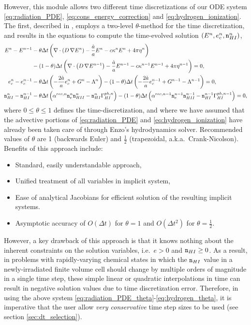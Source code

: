 \documentclass[letterpaper,10pt]{article}
\renewcommand{\(}{\left(}
\renewcommand{\)}{\right)}
\newcommand{\dt}{\Delta t}
\newcommand{\mn}{{\tt n}}
\begin{document}
However, this module allows two different time discretizations of our
ODE system \eqref{eq:radiation_PDE}, \eqref{eq:cons_energy_correction}
and \eqref{eq:hydrogen_ionization}.  The first, described in
\cite{ReynoldsHayesPaschosNorman2009}, employs a two-level
$\theta$-method for the time discretization, and results in the
equations to compute the time-evolved solution $(E^n,e_c^n,\mn_{HI}^n)$,
\begin{align}
  \label{eq:radiation_PDE_theta}
  E^n - E^{n-1} &- \theta\dt\left(\nabla\cdot\(D\,\nabla E^n\) - \frac{\dot{a}}{a} E^n -
    c\kappa^n E^n + 4\pi\eta^n\right) \\ 
  \notag
  & - (1-\theta)\dt\left(\nabla\cdot\(D\,\nabla E^{n-1}\) - \frac{\dot{a}}{a} E^{n-1} -
    c\kappa^{n-1} E^{n-1} + 4\pi\eta^{n-1}\right) = 0, \\ 
  \label{eq:energy_correction_theta}
  e_c^n - e_c^{n-1} &- \theta\dt\left(-\frac{2\dot{a}}{a}e_c^{n} + G^{n} -
    \Lambda^{n}\right) - (1-\theta)\dt\left(-\frac{2\dot{a}}{a}e_c^{n-1} + G^{n-1} -
    \Lambda^{n-1}\right) = 0, \\
  \label{eq:hydrogen_theta}
  \mn_{HI}^n - \mn_{HI}^{n-1} &-
    \theta\dt\left(\alpha^{rec,n} \mn_e^{n} \mn_{HII}^{n} -
      \mn_{HI}^{n} \Gamma_{HI}^{ph,n}\right) -
    (1-\theta)\dt\left(\alpha^{rec,n-1} \mn_e^{n-1} \mn_{HII}^{n-1} -
      \mn_{HI}^{n-1} \Gamma_{HI}^{ph,n-1}\right) = 0,
\end{align}
where $0\le\theta\le 1$ defines the time-discretization, and where we
have assumed that the advective portions of \eqref{eq:radiation_PDE}
and \eqref{eq:hydrogen_ionization} have already been taken care of
through Enzo's hydrodynamics solver.  Recommended values of $\theta$
are 1 (backwards Euler) and $\frac12$ (trapezoidal,
a.k.a.~Crank-Nicolson).  Benefits of this approach include:
\begin{itemize}
\item Standard, easily understandable approach,
\item Unified treatment of all variables in implicit system,
\item Ease of analytical Jacobians for efficient solution of the
  resulting implicit systems.
\item Asymptotic accuracy of $O(\dt)$ for $\theta=1$ and $O(\dt^2)$
  for $\theta=\frac12$. 
\end{itemize}
However, a key drawback of this approach is that it knows nothing
about the inherent constraints on the solution variables, i.e.~$e>0$
and $\mn_{HI}\ge 0$.  As a result, in problems with rapidly-varying
chemical states in which the $\mn_{HI}$ value in a newly-irradiated
finite volume cell should change by multiple orders of magnitude in a
single time step, these simple linear or quadratic interpolations in
time can result in negative solution values due to time discretization
error.  Therefore, in using the above system
\eqref{eq:radiation_PDE_theta}-\eqref{eq:hydrogen_theta}, it is
imperative that the user allow {\em very conservative} time step sizes
to be used (see section \ref{sec:dt_selection}).
\end{document}
